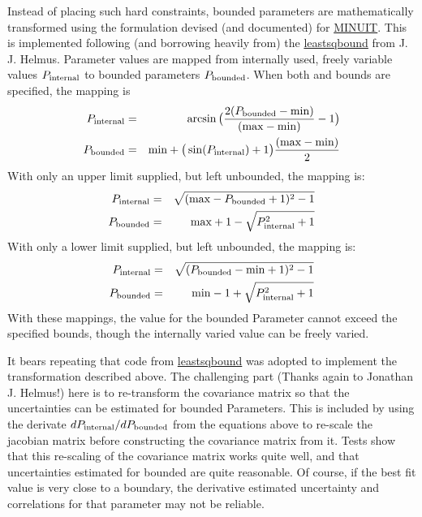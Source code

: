 \documentclass[letterpaper,10pt,english]{sphinxmanual}
\begin{document}
Instead of placing such hard constraints, bounded parameters are
mathematically transformed using the formulation devised (and documented)
for \href{http://en.wikipedia.org/wiki/MINUIT}{MINUIT}.  This is implemented following (and borrowing heavily from)
the \href{https://github.com/jjhelmus/leastsqbound-scipy}{leastsqbound} from J. J. Helmus.   Parameter values are mapped from
internally used, freely variable values $P_{\rm internal}$ to bounded
parameters $P_{\rm bounded}$.   When both  and  bounds
are specified, the mapping is
\begin{eqnarray*}
     P_{\rm internal} &=& \arcsin\big(\frac{2 (P_{\rm bounded} - {\rm min})}{({\rm max} - {\rm min})} - 1\big) \\
     P_{\rm bounded}  &=& {\rm min} + \big(\sin(P_{\rm internal}) + 1\big) \frac{({\rm max} - {\rm min})}{2}
 \end{eqnarray*}
With only an upper limit  supplied, but  left unbounded, the
mapping is:
\begin{eqnarray*}
     P_{\rm internal} &=& \sqrt{({\rm max} - P_{\rm bounded} + 1)^2 - 1} \\
     P_{\rm bounded}  &=& {\rm max} + 1 - \sqrt{P_{\rm internal}^2 + 1}
 \end{eqnarray*}
With only a lower limit  supplied, but  left unbounded, the
mapping is:
\begin{eqnarray*}
     P_{\rm internal} &=& \sqrt{(P_{\rm bounded} - {\rm min} + 1)^2 - 1} \\
     P_{\rm bounded}  &=& {\rm min} - 1 + \sqrt{P_{\rm internal}^2 + 1}
\end{eqnarray*}
With these mappings, the value for the bounded Parameter cannot exceed the
specified bounds, though the internally varied value can be freely varied.

It bears repeating that code from \href{https://github.com/jjhelmus/leastsqbound-scipy}{leastsqbound} was adopted to implement
the transformation described above.  The challenging part (Thanks again to
Jonathan J. Helmus!) here is to re-transform the covariance matrix so that
the uncertainties can be estimated for bounded Parameters.  This is
included by using the derivate $dP_{\rm internal}/dP_{\rm bounded}$
from the equations above to re-scale the jacobian matrix before
constructing the covariance matrix from it.  Tests show that this
re-scaling of the covariance matrix works quite well, and that
uncertainties estimated for bounded are quite reasonable.  Of course, if
the best fit value is very close to a boundary, the derivative estimated
uncertainty and correlations for that parameter may not be reliable.
\end{document}
